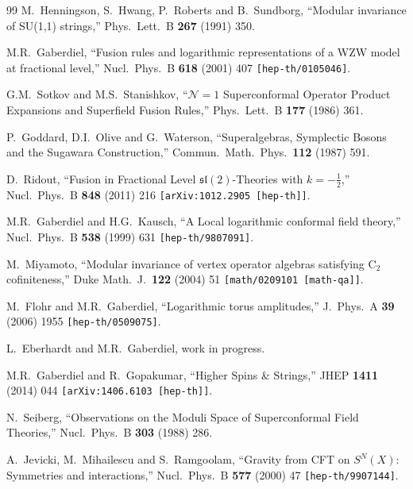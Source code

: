 \documentclass[12pt,a4paper]{article}
\begin{document}
\begin{thebibliography}{99}
  M.~Henningson, S.~Hwang, P.~Roberts and B.~Sundborg,
  ``Modular invariance of SU(1,1) strings,''
  Phys.\ Lett.\ B {\bf 267} (1991) 350.

M.R.~Gaberdiel,
``Fusion rules and logarithmic representations of a WZW model at fractional level,''
Nucl.\ Phys.\ B {\bf 618} (2001) 407
{\tt [hep-th/0105046]}.

G.M.~Sotkov and M.S.~Stanishkov,
 ``$\mathcal{N}=1$ Superconformal Operator Product Expansions and Superfield Fusion Rules,''
Phys.\ Lett.\ B {\bf 177} (1986) 361.

P.~Goddard, D.I.~Olive and G.~Waterson,
``Superalgebras, Symplectic Bosons and the Sugawara Construction,''
Commun.\ Math.\ Phys.\  {\bf 112} (1987) 591.

D.~Ridout,
``Fusion in Fractional Level $\mathfrak{sl}(2)$-Theories with $k=-\tfrac{1}{2}$,''
Nucl.\ Phys.\ B {\bf 848} (2011) 216
{\tt [arXiv:1012.2905 [hep-th]]}.

M.R.~Gaberdiel and H.G.~Kausch,
``A Local logarithmic conformal field theory,''
Nucl.\ Phys.\ B {\bf 538} (1999) 631
{\tt [hep-th/9807091]}.

M.~Miyamoto,
``Modular invariance of vertex operator algebras satisfying $\mathrm{C}_2$ cofiniteness,''
Duke Math.\ J.\ {\bf 122} (2004) 51
{\tt [math/0209101 [math-qa]]}.

M.~Flohr and M.R.~Gaberdiel,
``Logarithmic torus amplitudes,''
J.\ Phys.\ A {\bf 39} (2006) 1955
{\tt [hep-th/0509075]}.

L.~Eberhardt and M.R.~Gaberdiel,
work in progress.

M.R.~Gaberdiel and R.~Gopakumar,
``Higher Spins \& Strings,''
JHEP {\bf 1411} (2014) 044
{\tt [arXiv:1406.6103 [hep-th]]}.

  N.~Seiberg,
  ``Observations on the Moduli Space of Superconformal Field Theories,''
  Nucl.\ Phys.\ B {\bf 303} (1988) 286.
  
A.~Jevicki, M.~Mihailescu and S.~Ramgoolam,
``Gravity from CFT on $S^N(X)$: Symmetries and interactions,''
Nucl.\ Phys.\ B {\bf 577} (2000) 47
{\tt [hep-th/9907144]}.


\end{thebibliography}
\end{document}
